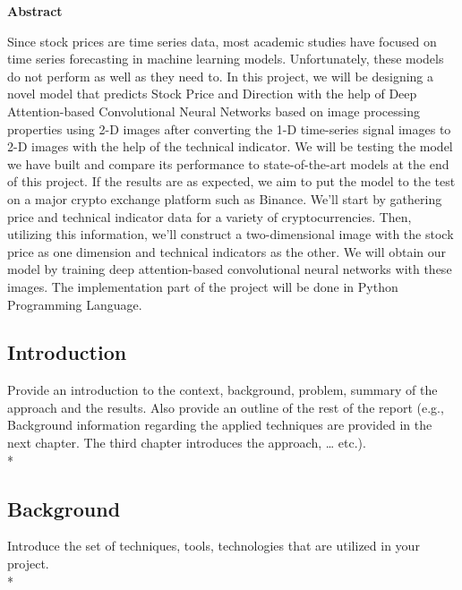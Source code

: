 \documentclass{article}
\begin{document}
\tableofcontents

\maketitle
\begin{center}
    \textbf{\Large Abstract}
\end{center}
Since stock prices are time series data, most academic studies have focused on time series forecasting in machine learning models. Unfortunately, these models do not perform as well as they need to. In this project, we will be designing a novel model that predicts Stock Price and Direction with the help of Deep Attention-based Convolutional Neural Networks based on image processing properties using 2-D images after converting the 1-D time-series signal images to 2-D images with the help of the technical indicator. We will be testing the model we have built and compare its performance to state-of-the-art models at the end of this project. If the results are as expected, we aim to put the model to the test on a major crypto exchange platform such as Binance. We'll start by gathering price and technical indicator data for a variety of cryptocurrencies. Then, utilizing this information, we'll construct a two-dimensional image with the stock price as one dimension and technical indicators as the other. We will obtain our model by training deep attention-based convolutional neural networks with these images. The implementation part of the project will be done in Python Programming Language. 

\begin{center}
    \section{Introduction}
\end{center}
Provide an introduction to the context, background, problem, summary of the approach and the results. Also provide an outline of the rest of the report (e.g., Background information regarding the applied techniques are provided in the next chapter. The third chapter introduces the approach, … etc.).\\*

\begin{center}
    \section{Background}
\end{center}
Introduce the set of techniques, tools, technologies that are utilized in your project.\\*
\end{document}
